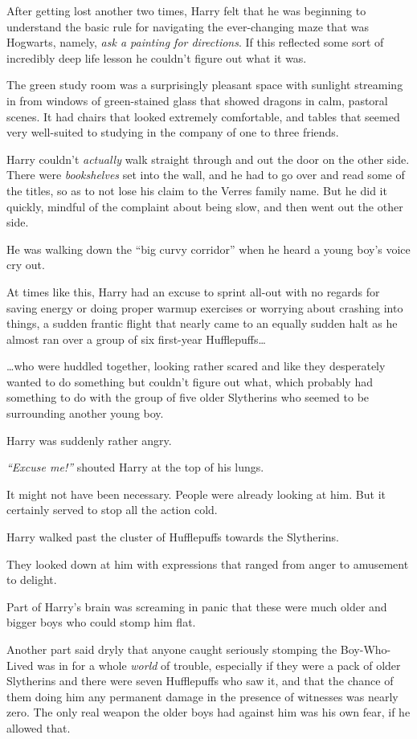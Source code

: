 After getting lost another two times, Harry felt that he was beginning
to understand the basic rule for navigating the ever-changing maze that
was Hogwarts, namely, \emph{ask a painting for directions}. If this
reflected some sort of incredibly deep life lesson he couldn't figure
out what it was.

The green study room was a surprisingly pleasant space with sunlight
streaming in from windows of green-stained glass that showed dragons in
calm, pastoral scenes. It had chairs that looked extremely comfortable,
and tables that seemed very well-suited to studying in the company of
one to three friends.

Harry couldn't \emph{actually} walk straight through and out the door on
the other side. There were \emph{bookshelves} set into the wall, and he
had to go over and read some of the titles, so as to not lose his claim
to the Verres family name. But he did it quickly, mindful of the
complaint about being slow, and then went out the other side.

He was walking down the ``big curvy corridor'' when he heard a young
boy's voice cry out.

At times like this, Harry had an excuse to sprint all-out with no
regards for saving energy or doing proper warmup exercises or worrying
about crashing into things, a sudden frantic flight that nearly came to
an equally sudden halt as he almost ran over a group of six first-year
Hufflepuffs\ldots{}

\ldots{}who were huddled together, looking rather scared and like they
desperately wanted to do something but couldn't figure out what, which
probably had something to do with the group of five older Slytherins who
seemed to be surrounding another young boy.

Harry was suddenly rather angry.

\emph{``Excuse me!''} shouted Harry at the top of his lungs.

It might not have been necessary. People were already looking at him.
But it certainly served to stop all the action cold.

Harry walked past the cluster of Hufflepuffs towards the Slytherins.

They looked down at him with expressions that ranged from anger to
amusement to delight.

Part of Harry's brain was screaming in panic that these were much older
and bigger boys who could stomp him flat.

Another part said dryly that anyone caught seriously stomping the
Boy-Who-Lived was in for a whole \emph{world} of trouble, especially if
they were a pack of older Slytherins and there were seven Hufflepuffs
who saw it, and that the chance of them doing him any permanent damage
in the presence of witnesses was nearly zero. The only real weapon the
older boys had against him was his own fear, if he allowed that.

